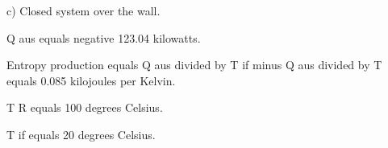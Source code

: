 c) Closed system over the wall.  

Q aus equals negative 123.04 kilowatts.  

Entropy production equals Q aus divided by T if minus Q aus divided by T equals 0.085 kilojoules per Kelvin.  

T R equals 100 degrees Celsius.  

T if equals 20 degrees Celsius.